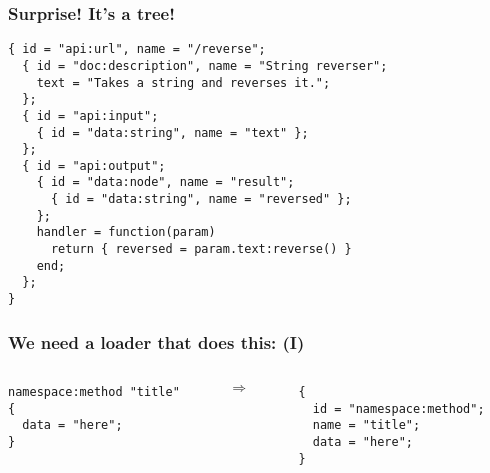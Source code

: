 \documentclass[handout]{beamer}
\begin{document}

\begin{frame}[fragile]

\frametitle{Surprise! It's a tree!}

\begin{verbatim}
{ id = "api:url", name = "/reverse";
  { id = "doc:description", name = "String reverser";
    text = "Takes a string and reverses it.";
  };
  { id = "api:input";
    { id = "data:string", name = "text" };
  };
  { id = "api:output";
    { id = "data:node", name = "result";
      { id = "data:string", name = "reversed" };
    };
    handler = function(param)
      return { reversed = param.text:reverse() }
    end;
  };
}
\end{verbatim}

\end{frame}


\begin{frame}[fragile]

\frametitle{We need a loader that does this: (I)}

\begin{columns}

\begin{column}{0.5\textwidth}
\begin{verbatim}
namespace:method "title"
{
  data = "here";
}
\end{verbatim}
\end{column}

\begin{column}{0.05\textwidth}
$\Rightarrow$
\end{column}

\begin{column}{0.5\textwidth}
\begin{verbatim}
{
  id = "namespace:method";
  name = "title";
  data = "here";
}
\end{verbatim}
\end{column}

\end{columns}
\end{frame}

\end{document}
